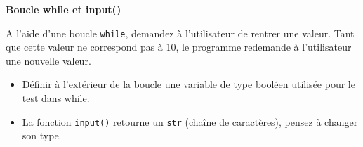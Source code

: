     \begin{Exercice}[10 minutes] \textbf{Boucle while et input()}
      	
      	A l'aide d'une boucle \lstinline{while}, demandez à l'utilisateur de rentrer une valeur. Tant que cette valeur ne correspond pas à 10, le programme redemande à l'utilisateur une nouvelle valeur.
    
        \begin{conseil}
           \begin{itemize}
           	\item Définir à l'extérieur de la boucle une variable de type booléen utilisée pour le test dans while.
           	\item La fonction \lstinline{input()} retourne un \lstinline{str} (chaîne de caractères), pensez à changer son type.
           \end{itemize}
		     
        \end{conseil}
        
        \begin{solution}
            
        \end{solution}
    \end{Exercice}
    
